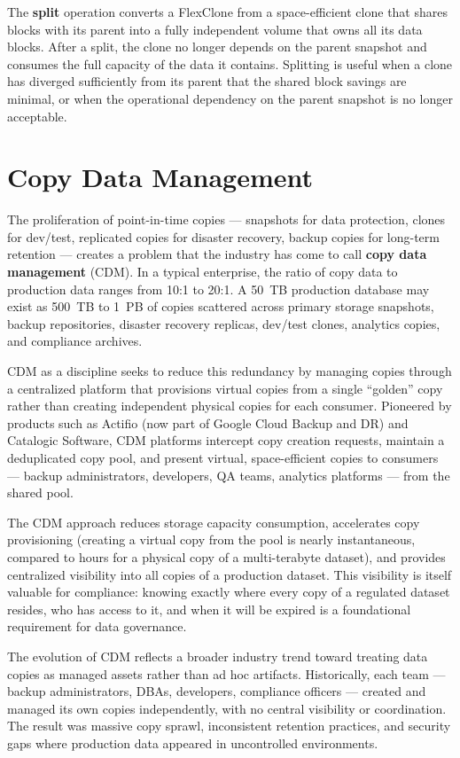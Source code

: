 The \textbf{split} operation converts a FlexClone from a space-efficient clone that shares blocks with its parent into a fully independent volume that owns all its data blocks. After a split, the clone no longer depends on the parent snapshot and consumes the full capacity of the data it contains. Splitting is useful when a clone has diverged sufficiently from its parent that the shared block savings are minimal, or when the operational dependency on the parent snapshot is no longer acceptable.

\section{Copy Data Management}

The proliferation of point-in-time copies --- snapshots for data protection, clones for dev/test, replicated copies for disaster recovery, backup copies for long-term retention --- creates a problem that the industry has come to call \textbf{copy data management} (CDM). In a typical enterprise, the ratio of copy data to production data ranges from 10:1 to 20:1. A 50~TB production database may exist as 500~TB to 1~PB of copies scattered across primary storage snapshots, backup repositories, disaster recovery replicas, dev/test clones, analytics copies, and compliance archives.

CDM as a discipline seeks to reduce this redundancy by managing copies through a centralized platform that provisions virtual copies from a single ``golden'' copy rather than creating independent physical copies for each consumer. Pioneered by products such as Actifio (now part of Google Cloud Backup and DR) and Catalogic Software, CDM platforms intercept copy creation requests, maintain a deduplicated copy pool, and present virtual, space-efficient copies to consumers --- backup administrators, developers, QA teams, analytics platforms --- from the shared pool.

The CDM approach reduces storage capacity consumption, accelerates copy provisioning (creating a virtual copy from the pool is nearly instantaneous, compared to hours for a physical copy of a multi-terabyte dataset), and provides centralized visibility into all copies of a production dataset. This visibility is itself valuable for compliance: knowing exactly where every copy of a regulated dataset resides, who has access to it, and when it will be expired is a foundational requirement for data governance.

The evolution of CDM reflects a broader industry trend toward treating data copies as managed assets rather than ad hoc artifacts. Historically, each team --- backup administrators, DBAs, developers, compliance officers --- created and managed its own copies independently, with no central visibility or coordination. The result was massive copy sprawl, inconsistent retention practices, and security gaps where production data appeared in uncontrolled environments.

